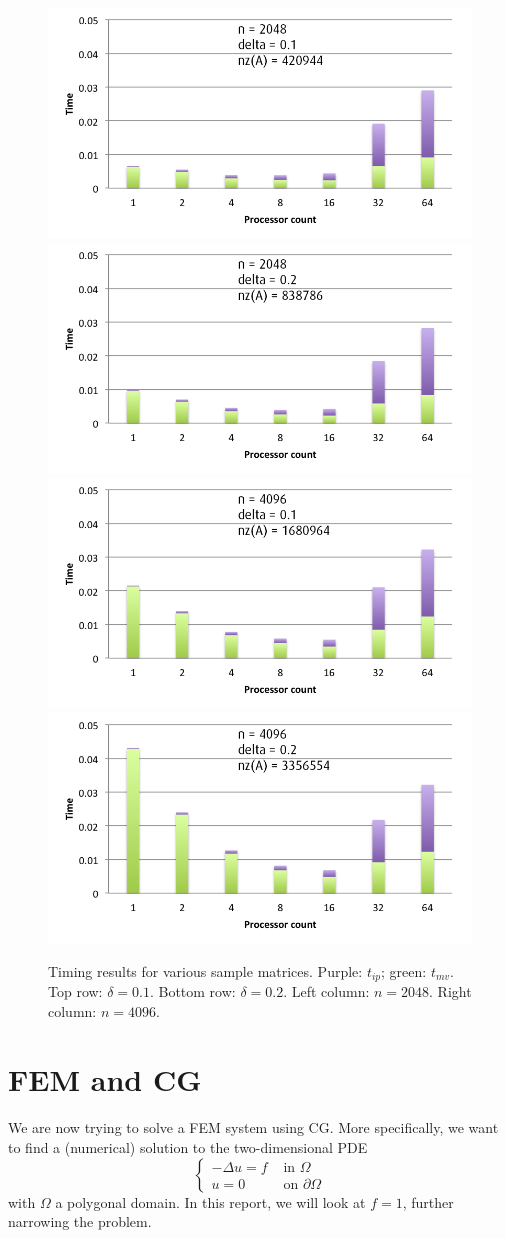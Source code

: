 \documentclass[11pt]{amsart}
\theoremstyle{definition}
\begin{document}
\begin{figure}
  \includegraphics[width=0.48\linewidth]{n2048d0_1mvip.png}
  \includegraphics[width=0.48\linewidth]{n2048d0_2mvip.png}
  \includegraphics[width=0.48\linewidth]{n4096d0_1mvip.png}
  \includegraphics[width=0.48\linewidth]{n4096d0_2mvip.png}
  \caption{Timing results for various sample matrices. Purple: $t_{ip}$; green: $t_{mv}$. Top row: $\delta = 0.1$. Bottom row: $\delta = 0.2$. Left column: $n = 2048$. Right column: $n = 4096$.}
  \label{fig:samples}
\end{figure}

\section{FEM and CG}
We are now trying to solve a FEM system using CG. More specifically, we want to find a (numerical) solution to the two-dimensional PDE
\begin{equation}
  \label{eqn:fem}
  \begin{cases} -\Delta u = f & \text{ in } \Omega \\ u = 0 & \text{ on } \partial \Omega \end{cases}
\end{equation}
with $\Omega$ a polygonal domain. In this report, we will look at $f=1$, further narrowing the problem.
\end{document}
